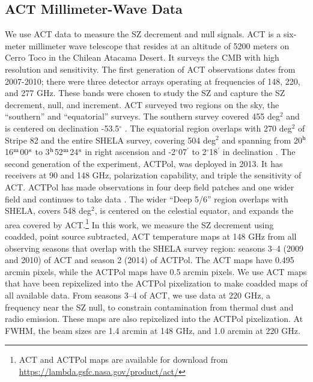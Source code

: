 \documentclass[a4paper,fleqn,usenatbib]{mnras}
\begin{document}
\subsection{ACT Millimeter-Wave Data}
We use ACT data to measure the SZ decrement and null signals. 
ACT is a six-meter millimeter wave telescope that resides at an altitude of 5200 meters on Cerro Toco in the Chilean Atacama Desert. 
It surveys the CMB with high resolution and sensitivity. 
The first generation of ACT observations dates from 2007-2010; there were three detector arrays operating at frequencies of 148, 220, and 277 GHz. 
These bands were chosen to study the SZ and capture the SZ decrement, null, and increment. 
ACT surveyed two regions on the sky, the ``southern'' and ``equatorial'' surveys. 
The southern survey covered 455 deg$^2$ and is centered on declination -53.5$^{\circ}$ \citep{2011ApJ...731..100M}. 
The equatorial region overlaps with 270 deg$^2$ of Stripe 82 and the entire SHELA survey, covering 504 deg$^2$ and spanning from 20$^{\rm h}$16$^{\rm m}$00$^{\rm s}$ to 3$^{\rm h}$52$^{\rm m}$24$^{\rm s}$ in right ascension and -2$^{\circ}$07$^{\prime}$ to 2$^{\circ}$18$^{\prime}$ in declination \citep{2013JCAP...07..008H}. 
The second generation of the experiment, ACTPol, was deployed in 2013.  It has receivers at 90 and 148 GHz, polarization capability,  and triple the sensitivity of ACT. 
ACTPol has made observations in four deep field patches and one wider field and continues to take data \citep{2014JCAP...10..007N,2018ApJS..235...20H}. 
The wider ``Deep 5/6'' region overlaps with SHELA, covers 548 deg$^2$, is centered on the celestial equator, and expands the area covered by ACT.\footnote{ACT and ACTPol maps are available for download from \url{https://lambda.gsfc.nasa.gov/product/act/}}
In this work, we measure the SZ decrement using coadded, point source subtracted, ACT temperature maps at 148 GHz from all observing seasons that overlap with the SHELA survey region: seasons 3--4 (2009 and 2010) of ACT and season 2 (2014) of ACTPol. 
The ACT maps have 0.495 arcmin pixels, while the ACTPol maps have 0.5 arcmin pixels. 
We use ACT maps that have been repixelized into the ACTPol pixelization to make coadded maps of all available data. %
From seasons 3--4 of ACT, we use data at 220 GHz, a frequency near the SZ null, to constrain contamination from thermal dust and radio emission. 
These maps are also repixelized into the ACTPol pixelization. 
At FWHM, the beam sizes are 1.4 arcmin at 148 GHz, and 1.0 arcmin at 220 GHz.
\end{document}
